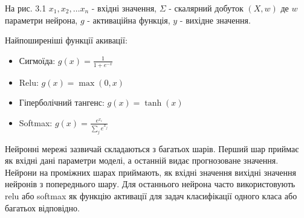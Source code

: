 На рис. 3.1 $x_1, x_2, \dots x_n$ - вхідні значення, $\Sigma$ - скалярний добуток $(X, w)$ де $w$ параметри нейрона, $g$ - активаційна функція, $y$ - вихідне значення. 

Найпоширеніші функції акивації:

\begin{itemize}
    \item Сигмоїда: $g(x) = \frac{1}{1 + e^{-x}}$
    \item Relu: $g(x) = \max(0, x)$
    \item Гіперболічний тангенс: $g(x) = \tanh(x)$
    \item Softmax: $g(x) = \frac{e^{x_i}}{\sum_{j} e^{x_j}}$
\end{itemize}

Нейронні мережі зазвичай складаються з багатьох шарів. 
Перший шар приймає як вхідні дані параметри моделі, а останній видає прогнозоване значення. 
Нейрони на проміжних шарах приймають, як вхідні значення вихідні значення нейронів з попереднього шару. 
Для останнього нейрона часто використовують relu або softmax як функцію активації для задач класифікації одного класа або багатьох відповідно.\cite{neural}


